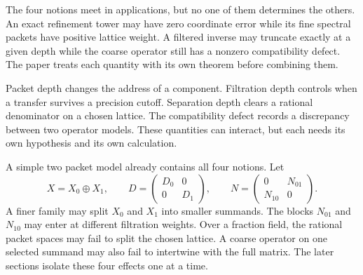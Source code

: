 The four notions meet in applications, but no one of them determines the others.  An exact refinement tower may have zero coordinate error while its fine spectral packets have positive lattice weight.  A filtered inverse may truncate exactly at a given depth while the coarse operator still has a nonzero compatibility defect.  The paper treats each quantity with its own theorem before combining them.

\begin{keyidea}
Packet depth changes the address of a component. Filtration depth controls when a transfer survives a precision cutoff. Separation depth clears a rational denominator on a chosen lattice. The compatibility defect records a discrepancy between two operator models. These quantities can interact, but each needs its own hypothesis and its own calculation.
\end{keyidea}

A simple two packet model already contains all four notions.  Let
\[
X=X_0\oplus X_1,
\qquad
D=\begin{pmatrix}D_0&0\\0&D_1\end{pmatrix},
\qquad
N=\begin{pmatrix}0&N_{01}\\N_{10}&0\end{pmatrix}.
\]
A finer family may split $X_0$ and $X_1$ into smaller summands.  The blocks $N_{01}$ and $N_{10}$ may enter at different filtration weights.  Over a fraction field, the rational packet spaces may fail to split the chosen lattice.  A coarse operator on one selected summand may also fail to intertwine with the full matrix.  The later sections isolate these four effects one at a time.

